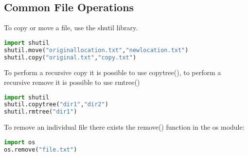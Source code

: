 \subsection{Common File Operations}
To copy or move a file, use the shutil library.
\lstset{basicstyle=\scriptsize, numbers=left, captionpos=b, tabsize=4}
\begin{lstlisting}[caption=Copy File,language={Python},
xleftmargin=15pt, label=lst:copyfile]
import shutil
shutil.move("originallocation.txt","newlocation.txt")
shutil.copy("original.txt","copy.txt")
\end{lstlisting}

To perform a recursive copy it is possible to use copytree(), to perform a
recursive remove it is possible to use rmtree()
\lstset{basicstyle=\scriptsize, numbers=left, captionpos=b, tabsize=4}
\begin{lstlisting}[caption=Recursive File handling,language={Python},
xleftmargin=15pt, label=lst:recursivefilehandling]
import shutil
shutil.copytree("dir1","dir2")
shutil.rmtree("dir1")
\end{lstlisting}

To remove an individual file there exists the remove() function in the os
module:
\lstset{basicstyle=\scriptsize, numbers=left, captionpos=b, tabsize=4}
\begin{lstlisting}[caption=Remove File,language={Python},
xleftmargin=15pt, label=lst:removefile]
import os
os.remove("file.txt")
\end{lstlisting}
